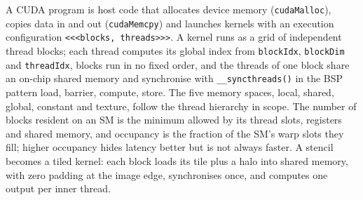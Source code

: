 \documentclass[../main.tex]{subfiles}
\begin{document}
\begin{keypoint}
  A CUDA program is host code that allocates device memory
  (\texttt{cudaMalloc}), copies data in and out (\texttt{cudaMemcpy}) and
  launches kernels with an execution configuration
  \texttt{<<<blocks, threads>>>}.  A kernel runs as a grid of
  independent thread blocks; each thread computes its global index from
  \texttt{blockIdx}, \texttt{blockDim} and \texttt{threadIdx}, blocks
  run in no fixed order, and the threads of one block share an on-chip
  shared memory and synchronise with \texttt{\_\_syncthreads()} in the
  BSP pattern load, barrier, compute, store.  The five memory spaces,
  local, shared, global, constant and texture, follow the thread
  hierarchy in scope.  The number of blocks resident on an SM is the
  minimum allowed by its thread slots, registers and shared memory, and
  occupancy is the fraction of the SM's warp slots they fill; higher
  occupancy hides latency better but is not always faster.  A stencil
  becomes a tiled kernel: each block loads its tile plus a halo into
  shared memory, with zero padding at the image edge, synchronises once,
  and computes one output per inner thread.
\end{keypoint}
\end{document}
